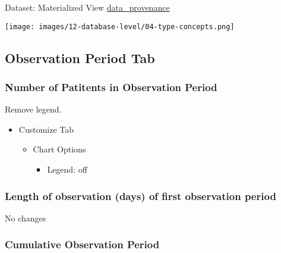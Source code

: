 \documentclass[
]{book}
\providecommand{\tightlist}{%
  \setlength{\itemsep}{0pt}\setlength{\parskip}{0pt}}
\begin{document}
Dataset: Materialized View \href{materialized-views-1.html\#data_provenance}{data\_provenance}

\texttt{[image: images/12-database-level/04-type-concepts.png]}

\hypertarget{observation-period-tab-1}{%
\subsection*{Observation Period Tab}\label{observation-period-tab-1}}

\hypertarget{number-of-patitents-in-observation-period-1}{%
\subsubsection*{Number of Patitents in Observation Period}\label{number-of-patitents-in-observation-period-1}}

Remove legend.

\begin{itemize}
\tightlist
\item
  Customize Tab

  \begin{itemize}
  \tightlist
  \item
    Chart Options

    \begin{itemize}
    \tightlist
    \item
      Legend: off
    \end{itemize}
  \end{itemize}
\end{itemize}

\hypertarget{length-of-observation-days-of-first-observation-period-1}{%
\subsubsection*{Length of observation (days) of first observation period}\label{length-of-observation-days-of-first-observation-period-1}}

No changes

\hypertarget{cumulative-observation-period-1}{%
\subsubsection*{Cumulative Observation Period}\label{cumulative-observation-period-1}}
\end{document}
